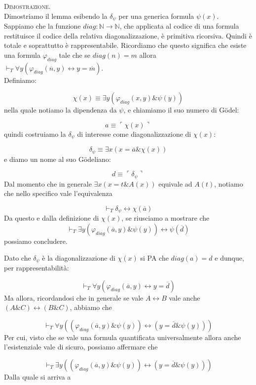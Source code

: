 	\textsc{Dimostrazione.}\\ 
	Dimostriamo il lemma esibendo la $\delta_\psi$ per una generica formula $\psi(x)$.\\
	Sappiamo che la funzione $diag:\mathbb{N}\rightarrow\mathbb{N}$, che applicata
	al codice di una formula restituisce il codice della relativa diagonalizzazione,
	\`e primitiva ricorsiva. Quindi  \`e totale e soprattutto \`e rappresentabile.
	Ricordiamo che questo significa che esiste una formula $\varphi_{diag}$ tale che
	se $diag(n)=m$ allora $\vdash_{T} \forall y(\varphi_{diag}(\overline{n},y)
	\leftrightarrow y=\overline{m})$.\\
	Definiamo:
	
	$$
	\chi(x)\equiv\exists y(\varphi_{diag}(x,y)\&\psi(y))
	$$
	nella quale notiamo la dipendenza da $\psi$, e chiamiamo il suo numero di G\"odel:
	
	$$
	a\equiv\ulcorner\chi(x)\urcorner
	$$
	quindi costruiamo la $\delta_\psi$ di interesse come diagonalizzazione di $\chi(x):$
	
	$$
	\delta_\psi \equiv \exists x(x=\overline{a} \& \chi(x))
	$$
	e diamo un nome al suo G\"odeliano:
	
	$$
	d\equiv \ulcorner\delta_\psi \urcorner
	$$
	Dal momento che in generale $\exists x(x = t \& A(x))$
	equivale ad $A(t)$, notiamo che nello specifico vale l'equivalenza
	
	$$
	\vdash_{T} \delta_\psi \leftrightarrow \chi(\overline{a})
	$$
	Da questo e dalla definizione di $\chi(x)$, se riusciamo a
	mostrare che $$\vdash_{T} \exists y(\varphi_{diag}(\overline{a},y)
	\&\psi(y)) \leftrightarrow \psi(\overline{d})
	$$
	possiamo concludere.

	Dato che $\delta_\psi$ \`e la diagonalizzazione di $\chi(x)$ si PA che
	$diag(a)=d$ e dunque, per rappresentabilit\`a:
	
	$$
	\vdash_{T} \forall y(\varphi_{diag}(\overline{a},y)\leftrightarrow y=\overline{d})
	$$
	Ma allora, ricordandosi che in generale se vale $A \leftrightarrow B$
	vale anche $(A \& C) \leftrightarrow (B \& C)$, abbiamo che
	
	$$
	\vdash_{T} \forall y((\varphi_{diag}(\overline{a},y)\&\psi(y))\leftrightarrow
	(y=\overline{d}\&\psi(y)))
	$$
	Per cui, visto che se vale una formula quantificata universalmente allora
	anche l'esistenziale vale di sicuro, possiamo affermare che
	
	$$
	\vdash_{T} \exists y((\varphi_{diag}(\overline{a},y)\&\psi(y))\leftrightarrow
	(y=\overline{d}\&\psi(y)))
	$$
	Dalla quale si arriva a
	
